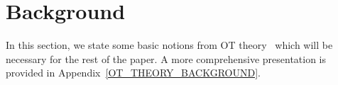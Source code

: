 \documentclass[runningheads]{llncs}
\newcommand\mycitet[1]{\cite{#1}}
\begin{document}

\section{Background}
In this section, we state some basic notions from OT theory~\citep{Villani, Ambrosio2013} which will be necessary for the rest of the paper. A more comprehensive presentation is provided in Appendix~\ref{OT_THEORY_BACKGROUND}. \\
\end{document}

